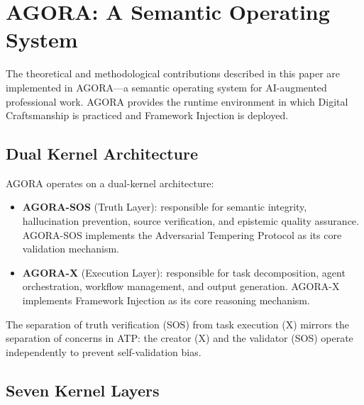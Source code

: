 \documentclass[12pt,a4paper]{article}
\begin{document}
\section{AGORA: A Semantic Operating System}
\label{sec:agora}

The theoretical and methodological contributions described in this paper are implemented in AGORA---a semantic operating system for AI-augmented professional work. AGORA provides the runtime environment in which Digital Craftsmanship is practiced and Framework Injection is deployed.

\subsection{Dual Kernel Architecture}

AGORA operates on a dual-kernel architecture:

\begin{itemize}
  \item \textbf{AGORA-SOS} (Truth Layer): responsible for semantic integrity, hallucination prevention, source verification, and epistemic quality assurance. AGORA-SOS implements the Adversarial Tempering Protocol as its core validation mechanism.
  \item \textbf{AGORA-X} (Execution Layer): responsible for task decomposition, agent orchestration, workflow management, and output generation. AGORA-X implements Framework Injection as its core reasoning mechanism.
\end{itemize}

The separation of truth verification (SOS) from task execution (X) mirrors the separation of concerns in ATP: the creator (X) and the validator (SOS) operate independently to prevent self-validation bias.

\subsection{Seven Kernel Layers}
\end{document}

